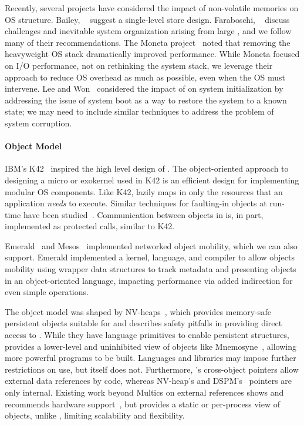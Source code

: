 Recently, several projects have considered the impact of non-volatile
memories on OS structure. Bailey,
\etal~\cite{bailey:hotos11} suggest a single-level store design.
Faraboschi, \etal~\cite{faraboschi:hotos15} discuss challenges and inevitable system organization
arising from large \NVM, and we follow many of their recommendations.
The Moneta
project~\cite{caulfield:micro10} noted that removing the
heavyweight OS stack dramatically improved performance.
While Moneta focused on I/O performance, not on rethinking the
system stack, we leverage their approach to reduce OS
overhead as much as possible, even when the OS must intervene.
Lee and Won~\cite{lee:hpcc13} considered the impact of \NVM on
system initialization by addressing the issue of system boot as a way to restore
the system to a known state; we may need to include similar techniques to
address the problem of system corruption.

\paragraph{Object Model}
IBM's K42~\cite{k42}
inspired the high level design of \Twizzler. The
object-oriented approach to designing a micro or exokernel used in K42 is an
efficient design for implementing modular OS components.
Like K42, \Twizzler lazily maps in only the resources that an
application \emph{needs} to execute. Similar techniques for faulting-in objects at
run-time have been studied~\cite{Hosking1993}. Communication between objects in
\Twizzler is, in part, implemented as protected calls, similar to K42.

Emerald~\cite{jul_implementation_1991,jul:tocs88} and Mesos~\cite{Hindman}
implemented networked object mobility, which
we can also support. Emerald implemented a kernel, language, and
compiler to allow objects mobility using
wrapper data structures to track metadata and presenting
objects in an object-oriented language, impacting performance via added indirection for even simple
operations.

The \Twizzler object model was shaped by
NV-heaps~\cite{coburn:asplos11}, which provides memory-safe persistent objects
suitable for \NVM and describes safety pitfalls in
providing direct access to \NVM. While they
have language primitives to enable persistent
structures, \Twizzler provides a lower-level and uninhibited view of
objects like Mnemosyne~\cite{volos:asplos11}, allowing
more powerful programs to be built. Languages and libraries may impose
further restrictions on \NVM use, but \Twizzler itself does not.
Furthermore, \Twizzler's cross-object pointers allow external data
references by code, whereas NV-heap's and DSPM's~\cite{shan:socc17} pointers are
only internal. Existing work beyond Multics on external references shows and
recommends hardware support~\cite{wang:micro17,libpmem}, but provides a
static or per-process view of objects, unlike \Twizzler, limiting scalability and flexibility.


